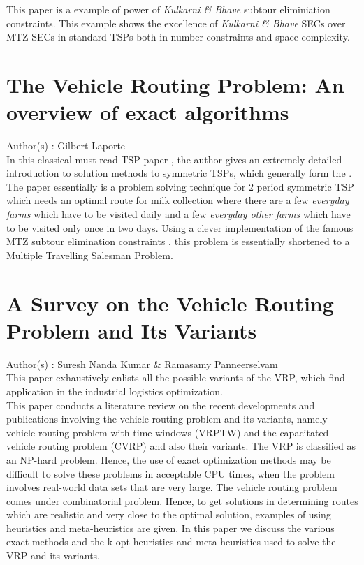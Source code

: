 \documentclass[11pt,fleqn]{book} %
\begin{document}
This paper is a example of power of \textit{Kulkarni \& Bhave } subtour eliminiation constraints. This example shows the excellence of \textit{Kulkarni \& Bhave } SECs over MTZ SECs in standard TSPs both in number constraints and space complexity.

\section{The Vehicle Routing Problem: An overview
of exact algorithms }
Author(s) : Gilbert Laporte \\
        
        In this classical must-read TSP paper , the author gives an extremely detailed introduction to solution methods to symmetric TSPs, which generally form the  .\\

The paper essentially is a problem solving technique for 2 period symmetric TSP which needs an optimal route for milk collection where there are a few \textit{everyday farms} which have to be visited daily and a few \textit{everyday other farms} which have to be visited only once in two days. Using a clever implementation of the famous MTZ subtour elimination constraints , this problem is essentially shortened to a Multiple Travelling Salesman Problem.


\section{A Survey on the Vehicle Routing Problem and
Its Variants}

Author(s) : Suresh Nanda Kumar \& Ramasamy Panneerselvam\\
        
        This paper exhaustively enlists all the possible variants of the VRP, which find application in the industrial logistics optimization.\\
        
        This paper conducts a literature review on the recent developments and publications involving the vehicle
routing problem and its variants, namely vehicle routing problem with time windows (VRPTW) and the capacitated vehicle routing problem (CVRP) and also their variants. The VRP is classified as an NP-hard problem. Hence, the use
of exact optimization methods may be difficult to solve these problems in acceptable CPU times, when the problem involves real-world data sets that are very large. The vehicle routing problem comes under combinatorial problem.
Hence, to get solutions in determining routes which are realistic and very close to the optimal solution, examples of using heuristics
and meta-heuristics are given. In this paper we discuss the various exact methods and the k-opt heuristics and meta-heuristics used to solve the VRP and its variants.
        
\end{document}
